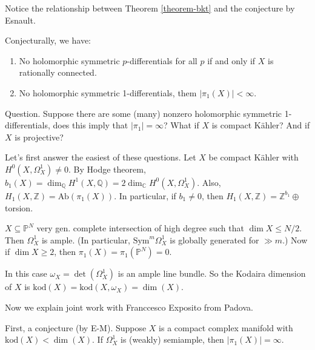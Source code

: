 \noindent
Notice the relationship between Theorem
\ref{theorem-bkt}
and the conjecture by Esnault.

\medskip\noindent
Conjecturally, we have:
\begin{enumerate}
\item No holomorphic symmetric
$p$-differentials for all $p$
if and only if $X$ is rationally connected.
\item No holomorphic symmetric
1-differentials, them $|\pi_1(X)|<\infty$.
\end{enumerate}

\noindent
Question. Suppose there are some (many)
nonzero holomorphic symmetric
1-differentials, does this imply that
$|\pi_1|=\infty$?
What if $X$ is compact Kähler? And if $X$ is
projective?

Let's first answer the easiest of these
questions.
Let $X$ be compact Kähler with
$H^0(X,\Omega^1_X)\neq 0$.
By Hodge theorem,
$b_1(X)=\dim_\mathbb{Q}H^1(X,\mathbb{Q})
=2\dim_\mathbb{C}H^0(X,\Omega_X^1)$.
Also,
$H_1(X,\mathbb{Z})=\text{Ab}(\pi_1(X))$.
In particular, if $b_1 \neq 0$,
then
$H_1(X,\mathbb{Z})=\mathbb{Z}^{b_1}\oplus$
torsion.

\begin{theorem}
\label{theorem-brotbeck-drondeau18}
$X \subseteq \mathbb{P}^N$ very gen. complete
intersection
of high degree such that $\dim X\leq N/2$.
Then $\Omega_X^1$ is ample.
(In particular, $\text{Sym}^m\Omega_X^1$
is globally generated for $\gg m$.)
Now if $\dim X\geq 2$, then
$\pi_1(X)=\pi_1(\mathbb{P}^N)=0$.
\end{theorem}

\noindent
In this case $\omega_X=\det(\Omega_X^1)$ is
an ample line bundle.
So the Kodaira dimension of $X$ is
$\text{kod}(X)=\text{kod}(X,\omega_X)=\dim(X)
$.

\medskip\noindent
Now we explain joint work with Franccesco
Exposito from Padova.

First, a conjecture (by E-M).
Suppose $X$ is a compact complex manifold
with $\text{kod}(X)<\dim(X)$. If $\Omega_X^1$
is (weakly) semiample, then
$|\pi_1(X)|=\infty$.

